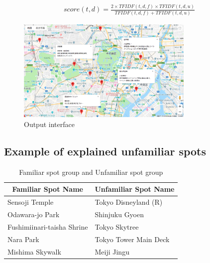 \documentclass[journal]{IAENGtran}
\begin{document}
\begin{eqnarray}
  score(t,d) = \frac{2 \times TFIDF(t,d,f) \times TFIDF(t,d,u)}{TFIDF(t,d,f) + TFIDF(t,d,u)}
  \label{math:Harmonic Mean}
\end{eqnarray}

\begin{figure}[t]
  \begin{center}
    \includegraphics[clip,width=8.5cm,bb=0 0 1289 750]{picture/Photo_Map.png}
    \caption{Output interface}
    \label{fig:photo_map}
   \end{center}
\end{figure}


\subsection{Example of explained unfamiliar spots}
\label{subsec:Example of explained unfamiliar spots}

\begin{table}[t]
  \caption{Familiar spot group and Unfamiliar spot group}
  \label{table:Familiar spot group and Unfamiliar spot group}
  \centering
  \begin{tabular}{l|l}
  \hline
  \multicolumn{1}{c|}{Familiar Spot Name} & \multicolumn{1}{c}{Unfamiliar Spot Name} \\ \hline
  Sensoji Temple                          & Tokyo Disneyland (R)                     \\
  Odawara-jo Park                         & Shinjuku Gyoen                           \\
  Fushimiinari-taisha Shrine              & Tokyo Skytree                            \\
  Nara Park                               & Tokyo Tower Main Deck            \\
  Mishima Skywalk                         & Meiji Jingu                              \\ \hline
  \end{tabular}
\end{table}
\end{document}
